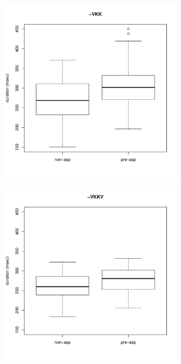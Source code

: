 \documentclass[11pt,a4paper,oneside,openany]{memoir}\usepackage[]{graphicx}\usepackage[]{color}
\newenvironment{knitrout}{}{} %
\begin{document}


\begin{figure}
\begin{subfigure}{.5\textwidth}
\centering
\begin{knitrout}
\color{fgcolor}
\includegraphics[width=\textwidth]{img/mono-stop-vor-1} 

\end{knitrout}
\end{subfigure}
\begin{subfigure}{.5\textwidth}
\centering
\begin{knitrout}
\color{fgcolor}
\includegraphics[width=\textwidth]{img/di-stop-vor-1} 


\end{knitrout}
\end{subfigure}
\end{figure}
\end{document}
